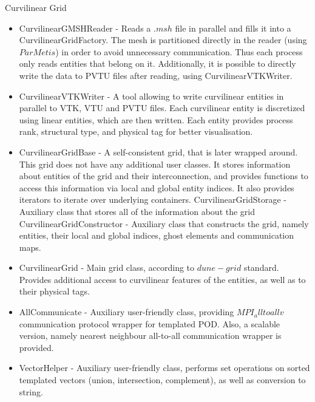 Curvilinear Grid
\begin{itemize}
	\item CurvilinearGMSHReader - Reads a $.msh$ file in parallel and fills it into a CurvilinearGridFactory. The mesh is partitioned directly in the reader (using $ParMetis$) in order to avoid unnecessary communication. Thus each process only reads entities that belong on it. Additionally, it is possible to directly write the data to PVTU files after reading, using CurvilinearVTKWriter.
	\item CurvilinearVTKWriter - A tool allowing to write curvilinear entities in parallel to VTK, VTU and PVTU files. Each curvilinear entity is discretized using linear entities, which are then written. Each entity provides process rank, structural type, and physical tag for better visualisation.
	\item CurvilinearGridBase - A self-consistent grid, that is later wrapped around. This grid does not have any additional user classes. It stores information about entities of the grid and their interconnection, and provides functions to access this information via local and global entity indices. It also provides iterators to iterate over underlying containers.
		\subitem CurvilinearGridStorage - Auxiliary class that stores all of the information about the grid
		\subitem CurvilinearGridConstructor - Auxiliary class that constructs the grid, namely entities, their local and global indices, ghost elements and communication maps.
	\item CurvilinearGrid - Main grid class, according to $dune-grid$ standard. Provides additional access to curvilinear features of the entities, as well as to their physical tags.
	\item AllCommunicate - Auxiliary user-friendly class, providing $MPI_alltoallv$ communication protocol wrapper for templated POD. Also, a scalable version, namely nearest neighbour all-to-all communication wrapper is provided.
	\item VectorHelper - Auxiliary user-friendly class, performs set operations on sorted templated vectors (union, intersection, complement), as well as conversion to string.
	
\end{itemize}